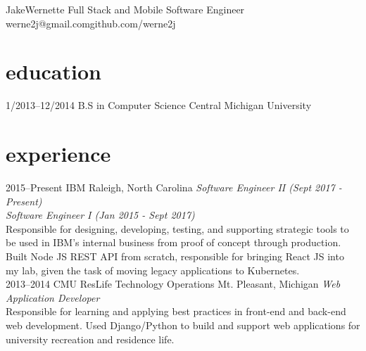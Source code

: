 \documentclass[]{friggeri-cv} %
\begin{document}
\header
{Jake}{Wernette}
{Full Stack and Mobile Software Engineer}
{werne2j@gmail.com\space\space\space\space\space\space github.com/werne2j}




\section{education}

\begin{entrylist}

\entry
{1/2013--12/2014}
{B.S in Computer Science{\normalfont}}
{Central Michigan University}

\end{entrylist}


\section{experience}

\begin{entrylist}
\entry
{2015--Present}
{IBM}
{Raleigh, North Carolina}
{\emph{Software Engineer II (Sept 2017 - Present)} \\
\emph{Software Engineer I (Jan 2015 - Sept 2017)} \\
Responsible for designing, developing, testing, and supporting strategic tools to be used in IBM's internal business from proof of concept through production.
Built Node JS REST API from scratch, responsible for bringing React JS into my lab, given the task of moving legacy applications to Kubernetes. }\\

\entry
{2013--2014}
{CMU ResLife Technology Operations}
{Mt. Pleasant, Michigan}
{\emph{Web Application Developer} \\
Responsible for learning and applying best practices in front-end and back-end web development. Used Django/Python to build and support web applications for university recreation and residence life.}\\

\end{entrylist}
\end{document}
